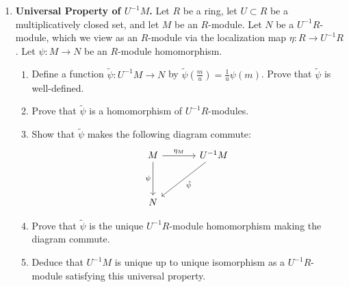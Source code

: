 \documentclass[12pt,reqno]{amsart}
\begin{document}
\begin{enumerate}[leftmargin=*,resume]
\item \textbf{Universal Property of $U^{-1}M$.} Let $R$ be a ring, let $U\subset R$ be a multiplicatively closed set, and let $M$ be an $R$-module. Let $N$ be a $U^{-1}R$-module, which we view as an $R$-module via the localization map $\eta:R\to U^{-1}R$. Let $\psi:M\to N$ be an $R$-module homomorphism.
\begin{enumerate}
	\item Define a function $\tilde{\psi}:U^{-1}M\to N$ by $\tilde{\psi}(\frac{m}{u})=\frac{1}{u}\psi(m)$. Prove that $\tilde{\psi}$ is well-defined.
	\item Prove that $\tilde{\psi}$ is a homomorphism of $U^{-1}R$-modules.
	\item Show that $\tilde{\psi}$ makes the following diagram commute:
	\[
	\begin{tikzcd}[row sep = 3.5em, column sep = 3.5em]
	M \arrow[r, "\eta_M"] \arrow[d, swap, "\psi"] & U^{-1}M \arrow[dl, "\tilde{\psi}"] \\
	N &
	\end{tikzcd}
	\]
	\item Prove that $\tilde{\psi}$ is the unique $U^{-1}R$-module homomorphism making the diagram commute.
	\item Deduce that $U^{-1}M$ is unique up to unique isomorphism as a $U^{-1}R$-module satisfying this universal property.
\end{enumerate}


\end{enumerate}
\end{document}
